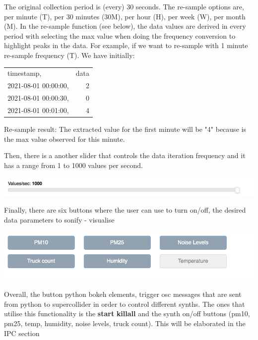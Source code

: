 \documentclass[11pt]{article}
\begin{document}
The original collection period is (every) 30 seconds.  The re-sample options are, per minute (T), per 30 minutes (30M), per hour (H), per week (W), per month (M).  In the re-sample function (see below), the data values are derived in every period with selecting the max value when doing the frequency conversion to highlight peaks in the data.  For example, if we want to re-sample with 1 minute re-sample frequency (T). We have initially:
\begin{center}
\begin{tabular}{lr}
\hline
timestamp, & data\\
2021-08-01 00:00:00, & 2\\
2021-08-01 00:00:30, & 0\\
2021-08-01 00:01:00, & 4\\
\hline
\end{tabular}
\end{center}

Re-sample result: The extracted value for the first minute will be "4" because is the max value observed for this minute.

Then, there is a another slider that controls the data iteration frequency and it has a range from 1 to 1000 values per second.

\begin{center}
\includegraphics[width=.9\linewidth]{./values_sec.png}
\end{center}

Finally, there are six buttons where the user can use to turn on/off, the desired data parameters to sonify - visualise

\begin{center}
\includegraphics[width=.9\linewidth]{./synth_onoff.png}
\end{center}

\vspace{0.5em}

Overall, the button python bokeh elements, trigger osc messages that are sent from python to supercollider in order to control different synths.
The ones that utilise this functionality is the \textbf{start} \textbf{killall} and the synth on/off buttons (pm10, pm25, temp, humidity, noise levels, truck count).
This will be elaborated in the IPC section
\end{document}
